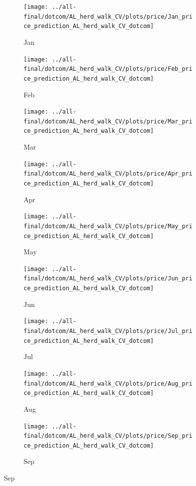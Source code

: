 \documentclass[ngerman]{ttlab-qualify}
\begin{document}
\newpage
\begin{figure}[H]
\centering
  \begin{subfigure}{.3\linewidth}
  \texttt{[image: ../all-final/dotcom/AL\_herd\_walk\_CV/plots/price/Jan\_price\_prediction\_AL\_herd\_walk\_CV\_dotcom]}\hfill
  \caption{Jan}
  \end{subfigure}
  \begin{subfigure}{.3\linewidth}
  \texttt{[image: ../all-final/dotcom/AL\_herd\_walk\_CV/plots/price/Feb\_price\_prediction\_AL\_herd\_walk\_CV\_dotcom]}\hfill
  \caption{Feb}
  \end{subfigure}
  \begin{subfigure}{.3\linewidth}
  \texttt{[image: ../all-final/dotcom/AL\_herd\_walk\_CV/plots/price/Mar\_price\_prediction\_AL\_herd\_walk\_CV\_dotcom]}\hfill
  \caption{Mar}
  \end{subfigure}\par\medskip
  \begin{subfigure}{.3\linewidth}
  \texttt{[image: ../all-final/dotcom/AL\_herd\_walk\_CV/plots/price/Apr\_price\_prediction\_AL\_herd\_walk\_CV\_dotcom]}\hfill
  \caption{Apr}
  \end{subfigure}
  \begin{subfigure}{.3\linewidth}
  \texttt{[image: ../all-final/dotcom/AL\_herd\_walk\_CV/plots/price/May\_price\_prediction\_AL\_herd\_walk\_CV\_dotcom]}\hfill
  \caption{May}
  \end{subfigure}
  \begin{subfigure}{.3\linewidth}
  \texttt{[image: ../all-final/dotcom/AL\_herd\_walk\_CV/plots/price/Jun\_price\_prediction\_AL\_herd\_walk\_CV\_dotcom]}\hfill
  \caption{Jun}
  \end{subfigure}\par\medskip
  \begin{subfigure}{.3\linewidth}
  \texttt{[image: ../all-final/dotcom/AL\_herd\_walk\_CV/plots/price/Jul\_price\_prediction\_AL\_herd\_walk\_CV\_dotcom]}\hfill
  \caption{Jul}
  \end{subfigure}
  \begin{subfigure}{.3\linewidth}
  \texttt{[image: ../all-final/dotcom/AL\_herd\_walk\_CV/plots/price/Aug\_price\_prediction\_AL\_herd\_walk\_CV\_dotcom]}\hfill
  \caption{Aug}
  \end{subfigure}
  \begin{subfigure}{.3\linewidth}
  \texttt{[image: ../all-final/dotcom/AL\_herd\_walk\_CV/plots/price/Sep\_price\_prediction\_AL\_herd\_walk\_CV\_dotcom]}\hfill
  \caption{Sep}

\end{subfigure}
\end{figure}
\end{document}
